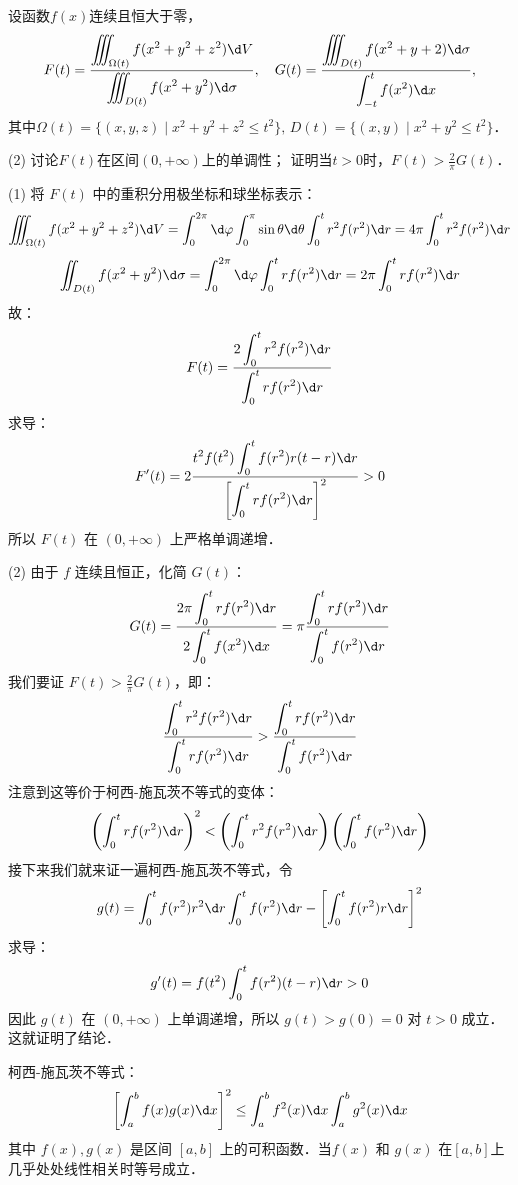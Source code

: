 \documentclass[12pt, a4paper, oneside, UTF8]{ctexbook}
\begin{document}
\begin{exercise}
    设函数$f(x)$连续且恒大于零，
    \[F(t)=\frac{\displaystyle \iiint_{\Omega(t)}f(x^2+y^2+z^2)\d V}{\displaystyle\iiint_{D(t)} f(x^2+y^2)\d \sigma},\quad G(t)=\frac{\displaystyle \iiint_{D(t)}f(x^2+y+2)\d \sigma}{\displaystyle\int_{-t}^tf(x^2)\d x},\]
    其中$\Omega(t)=\{(x,y,z)\mid x^2+y^2+z^2\le t^2\},\,D(t)=\{(x,y)\mid x^2+y^2\le t^2\}$．
    \begin{tasks}[label = (\arabic*)](2)
    \task 讨论$F(t)$在区间$(0,+\infty)$上的单调性；
    \task 证明当$t>0$时，$F(t)>\frac{2}{\pi}G(t)$．
    \end{tasks}
\end{exercise}
\begin{solution}
(1) 将 $F(t)$ 中的重积分用极坐标和球坐标表示：
\[ \iiint_{\Omega(t)} f(x^2+y^2+z^2) \d V = \int_0^{2\pi} \d\varphi \int_0^\pi \sin\theta \d\theta \int_0^t r^2 f(r^2) \d r = 4\pi \int_0^t r^2 f(r^2) \d r \]
\[ \iint_{D(t)} f(x^2+y^2) \d\sigma = \int_0^{2\pi} \d\varphi \int_0^t r f(r^2) \d r = 2\pi \int_0^t r f(r^2) \d r \]
故：
\[ F(t) = \frac{2\displaystyle\int_0^t r^2 f(r^2) \d r}{\displaystyle\int_0^t r f(r^2) \d r} \]
求导：
\[ F'(t) = 2\frac{\displaystyle t^2 f(t^2) \int_0^t f(r^2)r(t-r) \d r}{\displaystyle\left[ \int_0^t r f(r^2) \d r \right]^2} > 0\]
所以 $F(t)$ 在 $(0, +\infty)$ 上严格单调递增．

(2) 由于 $f$ 连续且恒正，化简 $G(t)$：
\[G(t) = \frac{\displaystyle 2\pi \int_0^t r f(r^2) \d r}{\displaystyle 2 \int_0^t f(x^2) \d x} = \pi \frac{\displaystyle\int_0^t r f(r^2) \d r}{\displaystyle\int_0^t f(r^2) \d r}\]
我们要证 $F(t) > \frac{2}{\pi} G(t)$，即：
\[\frac{\displaystyle\int_0^t r^2 f(r^2) \d r}{\displaystyle\int_0^t r f(r^2) \d r} > \frac{\displaystyle\int_0^t r f(r^2) \d r}{\displaystyle\int_0^t f(r^2) \d r} \]
注意到这等价于柯西-施瓦茨不等式的变体：
\[ \left( \int_0^t r f(r^2) \d r \right)^2 < \left( \int_0^t r^2 f(r^2) \d r \right) \left( \int_0^t f(r^2) \d r \right) \]
接下来我们就来证一遍柯西-施瓦茨不等式，令
\[g(t)=\int_0^tf(r^2)r^2\d r\int_0^tf(r^2)\d r-\left[\int_0^tf(r^2)r\d r\right]^2\]
求导：
\[g'(t)=f(t^2)\int_0^tf(r^2)(t-r)\d r > 0\]
因此 $g(t)$ 在 $(0, +\infty)$ 上单调递增，所以 $g(t) > g(0)=0$ 对 $t > 0$ 成立．
这就证明了结论．
\end{solution}
\begin{myRemark}
    柯西-施瓦茨不等式：
    \[\left[\int_a^bf(x)g(x)\d x\right]^2\le\int_a^bf^2(x)\d x\int_a^bg^2(x)\d x\]
    其中 $f(x), g(x)$ 是区间 $[a,b]$ 上的可积函数．当$f(x)$ 和 $g(x)$ 在$[a,b]$上几乎处处线性相关时等号成立．
\end{myRemark}
\ifx\allfiles\undefined
\end{document}

